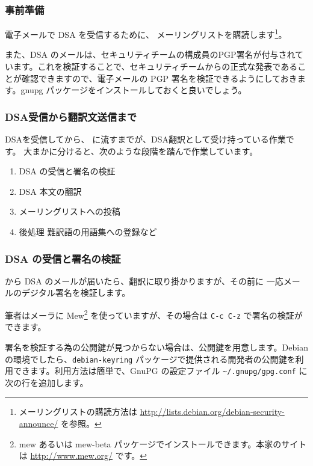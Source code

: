 \documentclass[mingoth,a4paper]{jsarticle}
\begin{document}
\subsubsection{事前準備}

電子メールで DSA を受信するために、 メーリングリストを購読します\footnote{メーリングリストの購読方法は \url{http://lists.debian.org/debian-security-announce/} を参照。}。

また、DSA のメールは、セキュリティチームの構成員のPGP署名が付与されています。これを検証することで、セキュリティチームからの正式な発表であることが確認できますので、電子メールの PGP 署名を検証できるようにしておきます。gnupg パッケージをインストールしておくと良いでしょう。



\subsubsection{DSA受信から翻訳文送信まで}

DSAを受信してから、  に流すまでが、DSA翻訳として受け持っている作業です。
大まかに分けると、次のような段階を踏んで作業しています。

\begin{enumerate}
\item DSA の受信と署名の検証
\item DSA 本文の翻訳
\item {} メーリングリストへの投稿
\item 後処理 難訳語の用語集への登録など
\end{enumerate}

\subsubsection{DSA の受信と署名の検証}

 から DSA のメールが届いたら、翻訳に取り掛かりますが、その前に 一応メールのデジタル署名を検証します。

筆者はメーラに Mew\footnote{mew あるいは mew-beta パッケージでインストールできます。本家のサイトは \url{http://www.mew.org/} です。} を使っていますが、その場合は \texttt{C-c C-z} で署名の検証ができます。

署名を検証する為の公開鍵が見つからない場合は、公開鍵を用意します。Debian の環境でしたら、\texttt{debian-keyring} パッケージで提供される開発者の公開鍵を利用できます。利用方法は簡単で、GnuPG の設定ファイル \texttt{\~{}/.gnupg/gpg.conf} に次の行を追加します。
\end{document}
